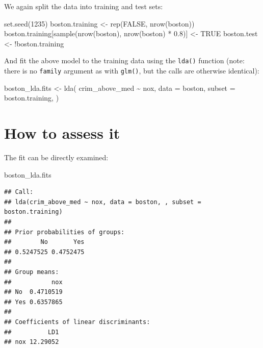 \documentclass[
]{book}
\newenvironment{Shaded}{\begin{snugshade}}{\end{snugshade}}
\newcommand{\AttributeTok}[1]{\textcolor[rgb]{0.77,0.63,0.00}{#1}}
\newcommand{\ConstantTok}[1]{\textcolor[rgb]{0.00,0.00,0.00}{#1}}
\newcommand{\DecValTok}[1]{\textcolor[rgb]{0.00,0.00,0.81}{#1}}
\newcommand{\FloatTok}[1]{\textcolor[rgb]{0.00,0.00,0.81}{#1}}
\newcommand{\FunctionTok}[1]{\textcolor[rgb]{0.00,0.00,0.00}{#1}}
\newcommand{\NormalTok}[1]{#1}
\newcommand{\OtherTok}[1]{\textcolor[rgb]{0.56,0.35,0.01}{#1}}
\newcommand{\SpecialCharTok}[1]{\textcolor[rgb]{0.00,0.00,0.00}{#1}}
\begin{document}
We again split the data into training and test sets:

\begin{Shaded}
\begin{Highlighting}[]
\FunctionTok{set.seed}\NormalTok{(}\DecValTok{1235}\NormalTok{)}
\NormalTok{boston.training }\OtherTok{\textless{}{-}} \FunctionTok{rep}\NormalTok{(}\ConstantTok{FALSE}\NormalTok{, }\FunctionTok{nrow}\NormalTok{(boston))}
\NormalTok{boston.training[}\FunctionTok{sample}\NormalTok{(}\FunctionTok{nrow}\NormalTok{(boston), }\FunctionTok{nrow}\NormalTok{(boston) }\SpecialCharTok{*} \FloatTok{0.8}\NormalTok{)] }\OtherTok{\textless{}{-}} \ConstantTok{TRUE}
\NormalTok{boston.test }\OtherTok{\textless{}{-}} \SpecialCharTok{!}\NormalTok{boston.training}
\end{Highlighting}
\end{Shaded}

And fit the above model to the training data using the \texttt{lda()} function (note: there is no \texttt{family} argument as with \texttt{glm()}, but the calls are otherwise identical):

\begin{Shaded}
\begin{Highlighting}[]
\NormalTok{boston\_lda.fits }\OtherTok{\textless{}{-}}
  \FunctionTok{lda}\NormalTok{(}
\NormalTok{    crim\_above\_med }\SpecialCharTok{\textasciitilde{}}\NormalTok{ nox,}
    \AttributeTok{data =}\NormalTok{ boston,}
    \AttributeTok{subset =}\NormalTok{ boston.training,}
\NormalTok{  )}
\end{Highlighting}
\end{Shaded}

\hypertarget{how-to-assess-it-3}{%
\section{How to assess it}\label{how-to-assess-it-3}}

The fit can be directly examined:

\begin{Shaded}
\begin{Highlighting}[]
\NormalTok{boston\_lda.fits}
\end{Highlighting}
\end{Shaded}

\begin{verbatim}
## Call:
## lda(crim_above_med ~ nox, data = boston, , subset = boston.training)
## 
## Prior probabilities of groups:
##        No       Yes 
## 0.5247525 0.4752475 
## 
## Group means:
##           nox
## No  0.4710519
## Yes 0.6357865
## 
## Coefficients of linear discriminants:
##          LD1
## nox 12.29052
\end{verbatim}
\end{document}
